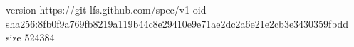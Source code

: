 version https://git-lfs.github.com/spec/v1
oid sha256:8fb0f9a769fb8219a119b44c8e29410e9e71ae2dc2a6e21e2cb3e3430359fbdd
size 524384
